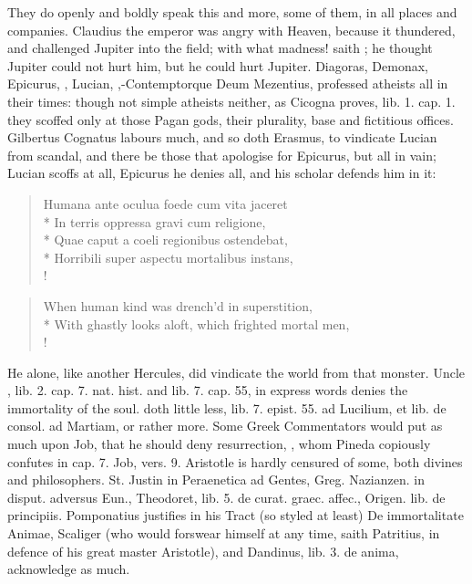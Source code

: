 {They do openly and boldly speak this and more, some of them, in all
places and companies. Claudius the emperor was angry with Heaven,
because it thundered, and challenged Jupiter into the field; with what
madness! saith \Seneca; he thought Jupiter could not hurt him, but he
could hurt Jupiter. Diagoras, Demonax, Epicurus, \Pliny{}, Lucian,
\Lucretius{},-Contemptorque Deum Mezentius, professed atheists all in
their times: though not simple atheists neither, as Cicogna proves,
lib. 1. cap. 1. they scoffed only at those Pagan gods, their plurality,
base and fictitious offices. Gilbertus Cognatus labours much, and so
doth Erasmus, to vindicate Lucian from scandal, and there be those that
apologise for Epicurus, but all in vain; Lucian scoffs at all, Epicurus
he denies all, and \Lucretius{} his scholar defends him in it:
%
\begin{latin}%
\begin{verse}%
Humana ante oculua foede cum vita jaceret\\*
In terris oppressa gravi cum religione,\\*
Quae caput a coeli regionibus ostendebat,\\*
Horribili super aspectu mortalibus instans, \etc{}\\!
\end{verse}%
\end{latin}%
\translationrule%
\begin{verse}%
When human kind was drench'd in superstition,\\*
With ghastly looks aloft, which frighted mortal men, \etc{}\\!
\end{verse}%
%

He alone, like another Hercules, did vindicate the world from that
monster. Uncle \Pliny{}, lib. 2. cap. 7. nat. hist. and lib. 7. cap.
55, in express words denies the immortality of the soul. \Seneca
doth little less, lib. 7. epist. 55. ad Lucilium, et lib. de consol. ad
Martiam, or rather more. Some Greek Commentators would put as much upon
Job, that he should deny resurrection, \etc{}, whom Pineda copiously
confutes in cap. 7. Job, vers. 9. Aristotle is hardly censured of some,
both divines and philosophers. St. Justin in Peraenetica ad Gentes,
Greg. Nazianzen. in disput. adversus Eun., Theodoret, lib. 5. de curat.
graec. affec., Origen. lib. de principiis. Pomponatius justifies in his
Tract (so styled at least) De immortalitate Animae, Scaliger (who would
forswear himself at any time, saith Patritius, in defence of his great
master Aristotle), and Dandinus, lib. 3. de anima, acknowledge as much.

}
